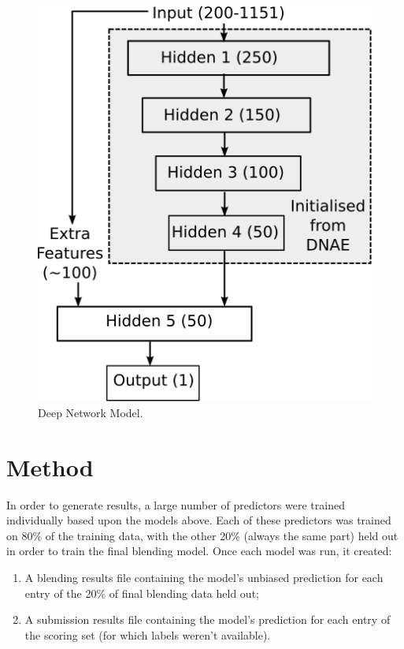 \documentclass{article}
\begin{document}
\begin{figure}[t]
\vskip 0.2in
\begin{center}
\centerline{\includegraphics{deepnet}}
\caption{Deep Network Model.}
\label{figure:deepnet}
\end{center}
\vskip -0.2in
\end{figure} 

\section{Method}

In order to generate results, a large number of predictors were trained individually based upon the models above.  Each of these predictors was trained on 80\% of the training data, with the other 20\% (always the same part) held out in order to train the final blending model.  Once each model was run, it created:

\begin{enumerate}
\item A blending results file containing the model's unbiased prediction for each entry of the 20\% of final blending data held out;
\item A submission results file containing the model's prediction for each entry of the scoring set (for which labels weren't available).
\end{enumerate}
\end{document}
